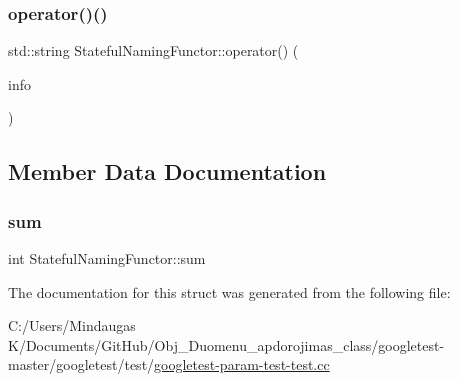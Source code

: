 \subsubsection{\texorpdfstring{operator()()}{operator()()}\hspace{0.1cm}{\footnotesize\ttfamily [3/3]}}
{\footnotesize\ttfamily std\+::string Stateful\+Naming\+Functor\+::operator() (\begin{DoxyParamCaption}\item[{const \+::\mbox{\hyperlink{structtesting_1_1_test_param_info}{testing\+::\+Test\+Param\+Info}}$<$ int $>$ \&}]{info }\end{DoxyParamCaption})\hspace{0.3cm}{\ttfamily [inline]}}



\subsection{Member Data Documentation}
\mbox{\label{struct_stateful_naming_functor_a95887cf031d3113ae2edcd7617af3b79}} 
\subsubsection{\texorpdfstring{sum}{sum}}
{\footnotesize\ttfamily int Stateful\+Naming\+Functor\+::sum}



The documentation for this struct was generated from the following file\+:\begin{DoxyCompactItemize}
\item 
C\+:/\+Users/\+Mindaugas K/\+Documents/\+Git\+Hub/\+Obj\+\_\+\+Duomenu\+\_\+apdorojimas\+\_\+class/googletest-\/master/googletest/test/\mbox{\hyperlink{googletest-master_2googletest_2test_2googletest-param-test-test_8cc}{googletest-\/param-\/test-\/test.\+cc}}\end{DoxyCompactItemize}
